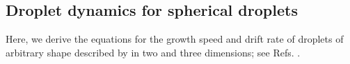 \begin{appendices}

\chapter{Droplet dynamics for spherical droplets}

\label{sec:droplet_dynamics}

Here, we derive the equations for the growth speed and drift rate of droplets of arbitrary shape described by  in two and three dimensions; see Refs. \cite{Review2019,Weber2017}.



\end{appendices}
